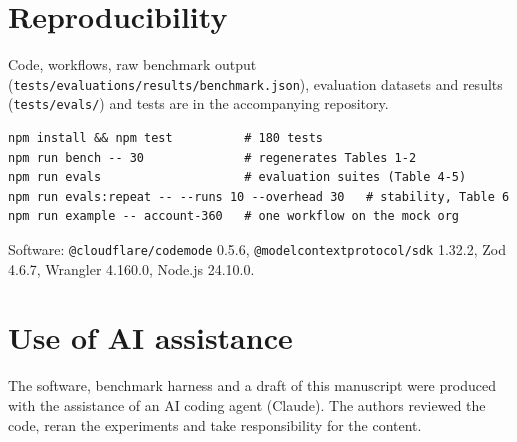 \documentclass[11pt]{article}
\begin{document}
\section*{Reproducibility}
Code, workflows, raw benchmark output (\texttt{tests/evaluations/results/benchmark.json}), evaluation datasets and results (\texttt{tests/evals/}) and tests are in the accompanying repository.
\begin{lstlisting}
npm install && npm test          # 180 tests
npm run bench -- 30              # regenerates Tables 1-2
npm run evals                    # evaluation suites (Table 4-5)
npm run evals:repeat -- --runs 10 --overhead 30   # stability, Table 6
npm run example -- account-360   # one workflow on the mock org
\end{lstlisting}
Software: \texttt{@cloudflare/codemode} 0.5.6, \texttt{@modelcontextprotocol/sdk} 1.32.2, Zod 4.6.7, Wrangler 4.160.0, Node.js 24.10.0.

\section*{Use of AI assistance}
The software, benchmark harness and a draft of this manuscript were produced with the assistance of an AI coding agent (Claude). The authors reviewed the code, reran the experiments and take responsibility for the content.
\end{document}
